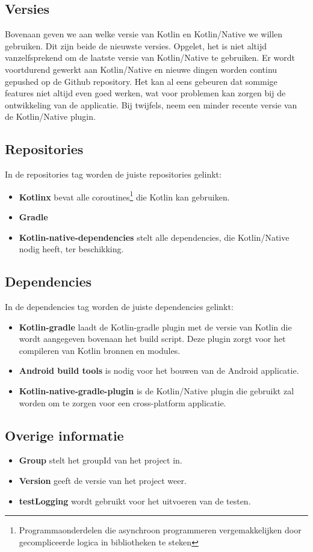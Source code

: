 \subsection{Versies}
Bovenaan geven we aan welke versie van Kotlin en Kotlin/Native we willen gebruiken. Dit zijn beide de nieuwste versies. Opgelet, het is niet altijd vanzelfsprekend om de laatste versie van Kotlin/Native te gebruiken. Er wordt voortdurend gewerkt aan Kotlin/Native en nieuwe dingen worden continu gepushed op de Github repository. Het kan al eens gebeuren dat sommige features niet altijd even goed werken, wat voor problemen kan zorgen bij de ontwikkeling van de applicatie. Bij twijfels, neem een minder recente versie van de Kotlin/Native plugin.

\subsection{Repositories}
In de repositories tag worden de juiste repositories gelinkt:
\begin{itemize}
	\item \textbf{Kotlinx} bevat alle coroutines\footnote{Programmaonderdelen die asynchroon programmeren vergemakkelijken door gecompliceerde logica in bibliotheken te steken} die Kotlin kan gebruiken.
	\item \textbf{Gradle}
	\item \textbf{Kotlin-native-dependencies} stelt alle dependencies, die Kotlin/Native nodig heeft, ter beschikking.
\end{itemize}

\subsection{Dependencies}
In de dependencies tag worden de juiste dependencies gelinkt:
\begin{itemize}
	\item \textbf{Kotlin-gradle} laadt de Kotlin-gradle plugin met de versie van Kotlin die wordt aangegeven bovenaan het build script. Deze plugin zorgt voor het compileren van Kotlin bronnen en modules.
	\item \textbf{Android build tools} is nodig voor het bouwen van de Android applicatie.
	\item \textbf{Kotlin-native-gradle-plugin} is de Kotlin/Native plugin die gebruikt zal worden om te zorgen voor een cross-platform applicatie.
\end{itemize}

\subsection{Overige informatie}
\label{sec:overige}
\begin{itemize}
	\item \textbf{Group} stelt het groupId van het project in.
	\item \textbf{Version} geeft de versie van het project weer.
	\item \textbf{testLogging} wordt gebruikt voor het uitvoeren van de testen.
\end{itemize}

